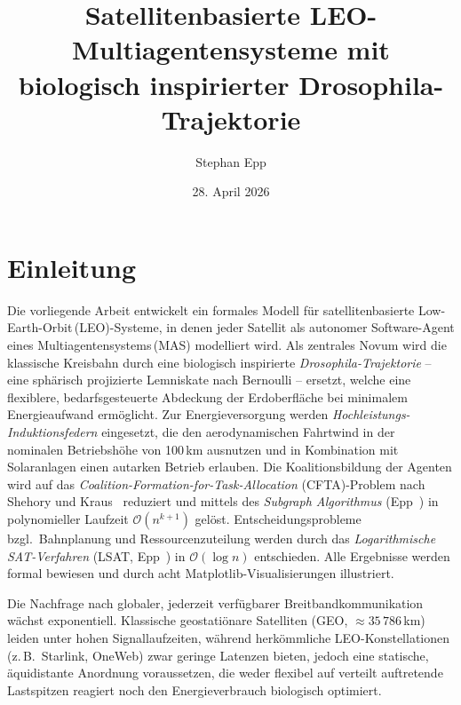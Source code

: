 ﻿\documentclass[a4paper,12pt]{article}
\title{Satellitenbasierte LEO-Multiagentensysteme mit biologisch inspirierter Drosophila-Trajektorie}
\author{Stephan Epp}
\date{28. April 2026}
\theoremstyle{definition}
\begin{document}

\maketitle
\tableofcontents
\newpage

\section{Einleitung}
Die vorliegende Arbeit entwickelt ein formales Modell f\"ur satellitenbasierte
Low-Earth-Orbit\,(LEO)-Systeme, in denen jeder Satellit als autonomer Software-Agent
eines Multiagentensystems\,(MAS) modelliert wird.
Als zentrales Novum wird die klassische Kreisbahn durch eine biologisch inspirierte
\emph{Drosophila-Trajektorie} -- eine sph\"arisch projizierte Lemniskate nach Bernoulli --
ersetzt, welche eine flexiblere, bedarfsgesteuerte Abdeckung der Erdoberfl\"ache
bei minimalem Energieaufwand erm\"oglicht.
Zur Energieversorgung werden \emph{Hochleistungs-Induktionsfedern} eingesetzt,
die den aerodynamischen Fahrtwind in der nominalen Betriebsh\"ohe von 100\,km
ausnutzen und in Kombination mit Solaranlagen einen autarken Betrieb erlauben.
Die Koalitionsbildung der Agenten wird auf das \emph{Coalition-Formation-for-Task-Allocation}
(CFTA)-Problem nach Shehory und Kraus~\cite{SK98} reduziert und mittels des
\emph{Subgraph Algorithmus} (Epp~\cite{Epp2026}) in polynomieller Laufzeit
$\mathcal{O}(n^{k+1})$ gel\"ost.
Entscheidungsprobleme bzgl.\ Bahnplanung und Ressourcenzuteilung werden durch
das \emph{Logarithmische SAT-Verfahren} (LSAT, Epp~\cite{Epp2026lsat}) in
$\mathcal{O}(\log n)$ entschieden.
Alle Ergebnisse werden formal bewiesen und durch acht Matplotlib-Visualisierungen
illustriert.

Die Nachfrage nach globaler, jederzeit verf\"ugbarer Breitbandkommunikation
w\"achst exponentiell. Klassische geostati\"onare Satelliten (GEO, $\approx 35\,786$\,km)
leiden unter hohen Signallaufzeiten, w\"ahrend herk\"ommliche LEO-Konstellationen
(z.\,B.\ Starlink, OneWeb) zwar geringe Latenzen bieten, jedoch eine statische,
\"aquidistante Anordnung voraussetzen, die weder flexibel auf verteilt auftretende
Lastspitzen reagiert noch den Energieverbrauch biologisch optimiert.
\end{document}

